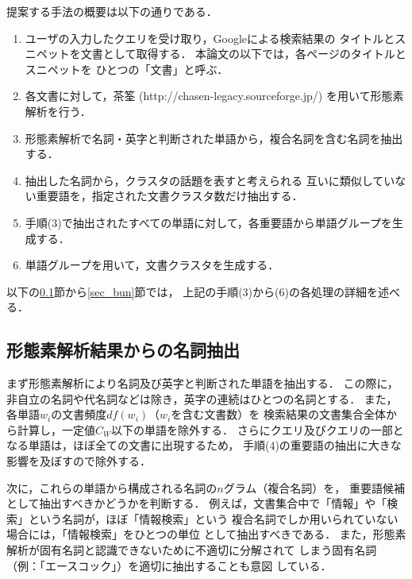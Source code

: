 \documentclass[japanese]{jnlp_1.4}
\begin{document}
提案する手法の概要は以下の通りである．

\begin{enumerate}
\item ユーザの入力したクエリを受け取り，Googleによる検索結果の
  タイトルとスニペットを文書として取得する．
  本論文の以下では，各ページのタイトルとスニペットを
  ひとつの「文書」と呼ぶ．

\item 各文書に対して，茶筌 (http://chasen-legacy.sourceforge.jp/) を用いて形態素解析を行う．
  
\item 形態素解析で名詞・英字と判断された単語から，複合名詞を含む名詞を抽出する．

\item 抽出した名詞から，クラスタの話題を表すと考えられる
  互いに類似していない重要語を，指定された文書クラスタ数だけ抽出する．
        
\item 手順(3)で抽出されたすべての単語に対して，各重要語から単語グループを生成する．

\item 単語グループを用いて，文書クラスタを生成する．
\end{enumerate}

以下の\ref{sec_WM}節から\ref{sec_bun}節では，
上記の手順(3)から(6)の各処理の詳細を述べる．



\subsection{形態素解析結果からの名詞抽出} \label{sec_WM}

まず形態素解析により名詞及び英字と判断された単語を抽出する．
この際に，非自立の名詞や代名詞などは除き，英字の連続はひとつの名詞とする．
また，各単語$w_i$の文書頻度$df(w_i)$（$w_{i}$を含む文書数）を
検索結果の文書集合全体から計算し，一定値$C_W$以下の単語を除外する．
さらにクエリ及びクエリの一部となる単語は，ほぼ全ての文書に出現するため，
手順(4)の重要語の抽出に大きな影響を及ぼすので除外する．

次に，これらの単語から構成される名詞の$n$グラム（複合名詞）を，
重要語候補として抽出すべきかどうかを判断する．
例えば，文書集合中で「情報」や「検索」という名詞が，ほぼ「情報検索」という
複合名詞でしか用いられていない場合には，「情報検索」をひとつの単位
として抽出すべきである．
また，形態素解析が固有名詞と認識できないために不適切に分解されて
しまう固有名詞（例：「エースコック」）を適切に抽出することも意図
している．
\end{document}
